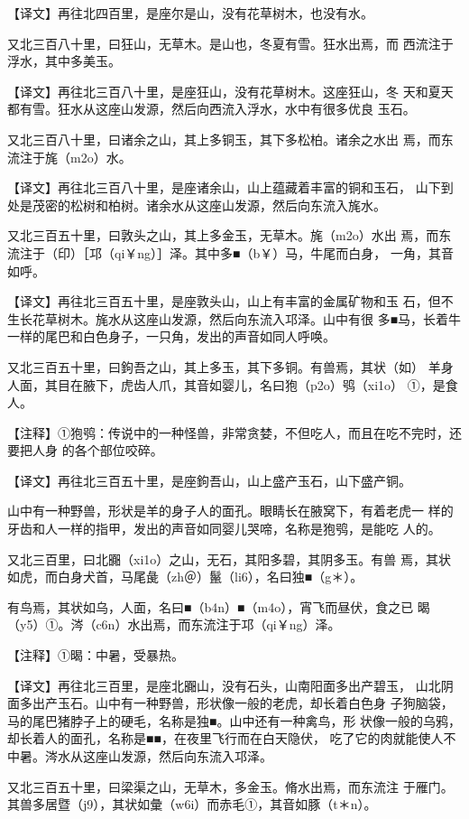 \documentclass[a4paper,12pt,UTF8,twoside]{ctexbook}
\begin{document}
【译文】再往北四百里，是座尔是山，没有花草树木，也没有水。

又北三百八十里，曰狂山，无草木。是山也，冬夏有雪。狂水出焉，而 西流注于浮水，其中多美玉。

【译文】再往北三百八十里，是座狂山，没有花草树木。这座狂山，冬 天和夏天都有雪。狂水从这座山发源，然后向西流入浮水，水中有很多优良 玉石。

又北三百八十里，曰诸余之山，其上多铜玉，其下多松柏。诸余之水出 焉，而东流注于旄（m2o）水。

【译文】再往北三百八十里，是座诸余山，山上蕴藏着丰富的铜和玉石， 山下到处是茂密的松树和柏树。诸余水从这座山发源，然后向东流入旄水。

又北三百五十里，曰敦头之山，其上多金玉，无草木。旄（m2o）水出 焉，而东流注于（印）［邛（qi￥ng）］泽。其中多■（b￥）马，牛尾而白身， 一角，其音如呼。

【译文】再往北三百五十里，是座敦头山，山上有丰富的金属矿物和玉 石，但不生长花草树木。旄水从这座山发源，然后向东流入邛泽。山中有很 多■马，长着牛一样的尾巴和白色身子，一只角，发出的声音如同人呼唤。

又北三百五十里，曰鉤吾之山，其上多玉，其下多铜。有兽焉，其状（如） 羊身人面，其目在腋下，虎齿人爪，其音如婴儿，名曰狍（p2o）鸮（xi1o） ①，是食人。

【注释】①狍鸮：传说中的一种怪兽，非常贪婪，不但吃人，而且在吃不完时，还要把人身 的各个部位咬碎。

【译文】再往北三百五十里，是座鉤吾山，山上盛产玉石，山下盛产铜。

山中有一种野兽，形状是羊的身子人的面孔。眼睛长在腋窝下，有着老虎一 样的牙齿和人一样的指甲，发出的声音如同婴儿哭啼，名称是狍鸮，是能吃 人的。

又北三百里，曰北嚻（xi1o）之山，无石，其阳多碧，其阴多玉。有兽 焉，其状如虎，而白身犬首，马尾彘（zh＠）鬣（li6），名曰独■（g＊）。

有鸟焉，其状如乌，人面，名曰■（b4n）■（m4o），宵飞而昼伏，食之已 暍（y5）①。涔（c6n）水出焉，而东流注于邛（qi￥ng）泽。

【注释】①暍：中暑，受暴热。

【译文】再往北三百里，是座北嚻山，没有石头，山南阳面多出产碧玉， 山北阴面多出产玉石。山中有一种野兽，形状像一般的老虎，却长着白色身 子狗脑袋，马的尾巴猪脖子上的硬毛，名称是独■。山中还有一种禽鸟，形 状像一般的乌鸦，却长着人的面孔，名称是■■，在夜里飞行而在白天隐伏， 吃了它的肉就能使人不中暑。涔水从这座山发源，然后向东流入邛泽。

又北三百五十里，曰梁渠之山，无草木，多金玉。脩水出焉，而东流注 于雁门。其兽多居暨（j9），其状如彙（w6i）而赤毛①，其音如豚（t＊n）。
\end{document}
